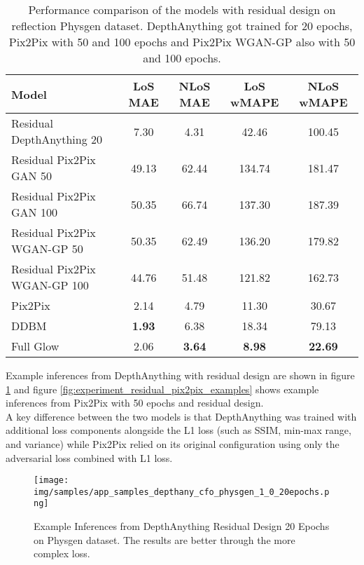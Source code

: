 		\begin{table}[h!]
			\centering
			\begin{tabular}{|l|c|c|c|c|}
				\hline
				\textbf{Model} & \textbf{LoS MAE} & \textbf{NLoS MAE} & \textbf{LoS wMAPE} & \textbf{NLoS wMAPE} \\
				\hline
				Residual DepthAnything 20 & 7.30 & 4.31 & 42.46 & 100.45 \\
				Residual Pix2Pix GAN 50 & 49.13 & 62.44 & 134.74 & 181.47 \\
				Residual Pix2Pix GAN 100 & 50.35 & 66.74 & 137.30 & 187.39 \\
				Residual Pix2Pix WGAN-GP 50 & 50.35 & 62.49 & 136.20 & 179.82 \\
				Residual Pix2Pix WGAN-GP 100 & 44.76 & 51.48 & 121.82 & 162.73 \\
				Pix2Pix & 2.14 & 4.79 & 11.30 & 30.67 \\
				DDBM & \textbf{1.93} & 6.38 & 18.34 & 79.13 \\
				Full Glow & 2.06 & \textbf{3.64} & \textbf{8.98} & \textbf{22.69} \\
				\hline
			\end{tabular}
			\caption{Performance comparison of the models with residual design on reflection Physgen dataset. DepthAnything got trained for 20 epochs, Pix2Pix with 50 and 100 epochs and Pix2Pix WGAN-GP also with 50 and 100 epochs.}
			\label{tab:experiment_residual_design_results}
		\end{table}
		\FloatBarrier
		
		Example inferences from DepthAnything with residual design are shown in figure \ref{fig:experiment_residual_depthanything_examples} and figure \ref{fig:experiment_residual_pix2pix_examples} shows example inferences from Pix2Pix with 50 epochs and residual design.\\
		A key difference between the two models is that DepthAnything was trained with additional loss components alongside the L1 loss (such as SSIM, min-max range, and variance) while Pix2Pix relied on its original configuration using only the adversarial loss combined with L1 loss.
		
		\begin{figure}[H]
			\centering
			\texttt{[image: img/samples/app\_samples\_depthany\_cfo\_physgen\_1\_0\_20epochs.png]}
			\caption[Example Inferences from DepthAnything Residual Design 20 Epochs on Physgen dataset. The results are better through the more complex loss.]{Example Inferences from DepthAnything Residual Design 20 Epochs on Physgen dataset. The results are better through the more complex loss.} 
			\label{fig:experiment_residual_depthanything_examples}
		\end{figure}
		\FloatBarrier
		
